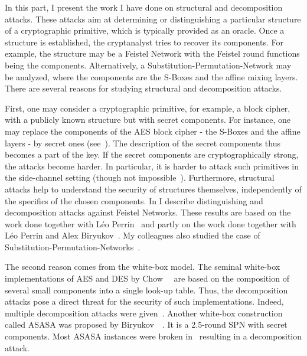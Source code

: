 In this part, I present the work I have done on structural and decomposition attacks. These attacks aim at determining or distinguishing a particular structure of a cryptographic primitive, which is typically provided as an oracle. Once a structure is established, the cryptanalyst tries to recover its components. For example, the structure may be a Feistel Network with the Feistel round functions being the components. Alternatively, a Substitution-Permutation-Network may be analyzed, where the components are the S-Boxes and the affine mixing layers. There are several reasons for studying structural and decomposition attacks.

First, one may consider a cryptographic primitive, for example, a block cipher, with a publicly known structure but with secret components. For instance, one may replace the components of the AES block cipher - the S-Boxes and the affine layers - by secret ones (see~\cite{AESsecret1,AESsecret2}). The description of the secret components thus becomes a part of the key. If the secret components are cryptographically strong, the attacks become harder. In particular, it is harder to attack such primitives in the side-channel setting (though not impossible~\cite{SCARE}). Furthermore, structural attacks help to understand the security of structures themselves, independently of the specifics of the chosen components. In  I describe distinguishing and decomposition attacks against Feistel Networks. These results are based on the work done together with Léo Perrin~\cite{OurFeistel} and partly on the work done together with Léo Perrin and Alex Biryukov~\cite{OurKuz1}. My colleagues also studied the case of Substitution-Permutation-Networks~\cite{LeoSPN}.

The second reason comes from the white-box model. The seminal white-box implementations of AES and DES by Chow~\etal{}~\cite{ChowAES,ChowDES} are based on the composition of several small components into a single look-up table. Thus, the decomposition attacks pose a direct threat for the security of such implementations. Indeed, multiple decomposition attacks were given~\cite{AttackBillet,AttackMulder,AttackLepoint}. Another white-box construction called ASASA was proposed by Biryukov~\etal{}~\cite{ASASA}. It is a 2.5-round SPN with secret components. Most ASASA instances were broken in~\cite{ASASA1,ASASA2} resulting in a decomposition attack.

